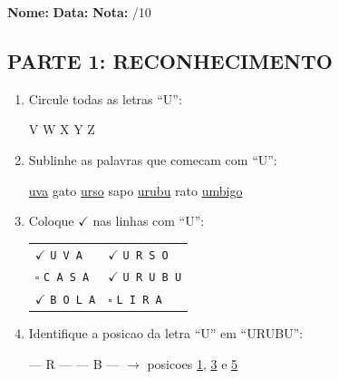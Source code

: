 

\begin{exercicio}
\noindent\textbf{Nome:} \underline{\hspace{3.2cm}} \quad \textbf{Data:} \underline{\hspace{1.6cm}} \quad \textbf{Nota:} \underline{\hspace{0.9cm}}/10

\subsection*{PARTE 1: RECONHECIMENTO}

\begin{enumerate}
  \item Circule todas as letras ``U'':
  \begin{center}
   \quad V \quad {} \quad W \quad {} \quad X \quad {} \quad Y \quad {} \quad Z
  \end{center}

  \item Sublinhe as palavras que comecam com ``U'':
  \begin{center}
  \uline{uva} \quad gato \quad \uline{urso} \quad sapo \quad \uline{urubu} \quad rato \quad \uline{umbigo}
  \end{center}

  \item Coloque $\checkmark$ nas linhas com ``U'':
  \begin{center}
  \begin{tabular}{ll}
  $\checkmark$ \texttt{U V A} & $\checkmark$ \texttt{U R S O} \\
  $\square$ \texttt{C A S A} & $\checkmark$ \texttt{U R U B U} \\
  $\checkmark$ \texttt{B O L A} & $\square$ \texttt{L I R A}
  \end{tabular}
  \end{center}

  \item Identifique a posicao da letra ``U'' em ``URUBU'':
  \begin{center}
   --- R ---  --- B ---  $\rightarrow$ posicoes \underline{1}, \underline{3} e \underline{5}
  \end{center}


\end{enumerate}
\end{exercicio}
